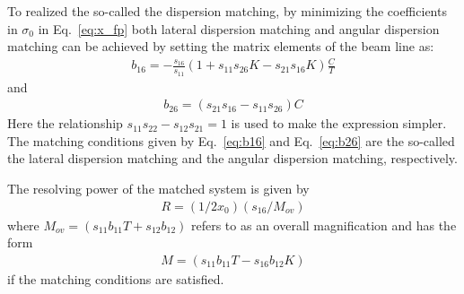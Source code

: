 To realized the so-called the dispersion matching, by minimizing the coefficients in  $\sigma_0$ in  Eq.~\ref{eq:x_fp} both lateral dispersion matching and angular dispersion matching can be  achieved by setting the matrix elements of the beam line as:
 \begin{equation}
    \label{eq:b16}
    \begin{aligned}
        b_{16} = -\frac{s_{16}}{s_{11}}(1 + s_{11}s_{26}K - s_{21}s_{16}K)\frac{C}{T}
    \end{aligned}
\end{equation}
and
 \begin{equation}
    \label{eq:b26}
    \begin{aligned}
        b_{26} = (s_{21}s_{16} - s_{11}s_{26})C
    \end{aligned}
\end{equation}
Here the relationship $s_{11}s_{22}-s_{12}s_{21}=1$ is used to make the expression simpler. The matching conditions given by Eq.~\ref{eq:b16} and Eq.~\ref{eq:b26} are the so-called the lateral dispersion matching and the angular dispersion matching, respectively.

The resolving power of the matched system is given by
 \begin{equation}
    \label{eq:R}
    \begin{aligned}
        R=(1/2x_0)(s_{16}/M_{ov})
    \end{aligned}
\end{equation}
where $M_{ov}=(s_{11}b_{11}T+s_{12}b_{12})$ refers to as an overall magnification and has the form
 \begin{equation}
    \label{eq:M}
    \begin{aligned}
        M=(s_{11}b_{11}T-s_{16}b_{12}K)
    \end{aligned}
\end{equation}
if the matching conditions are satisfied.


